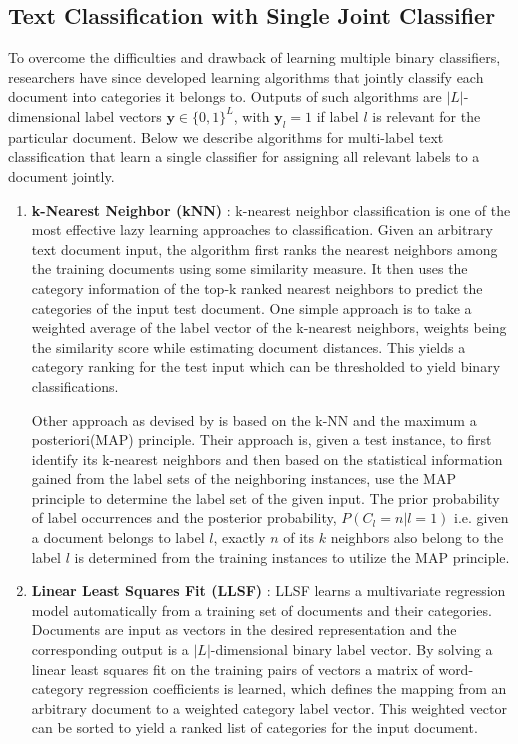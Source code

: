 \subsection{Text Classification with Single Joint Classifier}
To overcome the difficulties and drawback of learning multiple binary classifiers, researchers have since developed learning algorithms that jointly classify each document into categories it belongs to. Outputs of such algorithms are $|L|$-dimensional label vectors $\boldsymbol{y} \in \{0, 1\}^{L}$, with $\boldsymbol{y}_{l} = 1$ if label $l$ is relevant for the particular document. Below we describe algorithms for multi-label text classification that learn a single classifier for assigning all relevant labels to a document jointly.
\begin{enumerate}
\item{\textbf{k-Nearest Neighbor (kNN)} : }k-nearest neighbor classification is one of the most effective lazy learning approaches to classification. Given an arbitrary text document input, the algorithm first ranks the nearest neighbors among the training documents using some similarity measure. It then uses the category information of the top-k ranked nearest neighbors to predict the categories of the input test document. One simple approach is to take a weighted average of the label vector of the k-nearest neighbors, weights being the similarity score while estimating document distances. This yields a category ranking for the test input which can be thresholded to yield binary classifications.

Other approach as devised by \cite{zhang2007ml} is based on the k-NN and the maximum a posteriori(MAP) principle. Their approach is, given a test instance, to first identify its k-nearest neighbors and then based on the statistical information gained from the label sets of the neighboring instances, use the MAP principle to determine the label set of the given input. The prior probability of label occurrences and the posterior probability, $P(C_{l}=n | l=1)$ i.e. given a document belongs to label $l$, exactly $n$ of its $k$ neighbors also belong to the label $l$ is determined from the training instances to utilize the MAP principle.

\item{\textbf{Linear Least Squares Fit (LLSF)} : }LLSF\citep{yang1992linear} learns a multivariate regression model automatically from a training set of documents and their categories. Documents are input as vectors in the desired representation and the corresponding output is a $|L|$-dimensional binary label vector. By solving a linear least squares fit on the training pairs of vectors a matrix of word-category regression coefficients is learned, which defines the mapping from an arbitrary document to a weighted category label vector. This weighted vector can be sorted to yield a ranked list of categories for the input document.


\end{enumerate}
